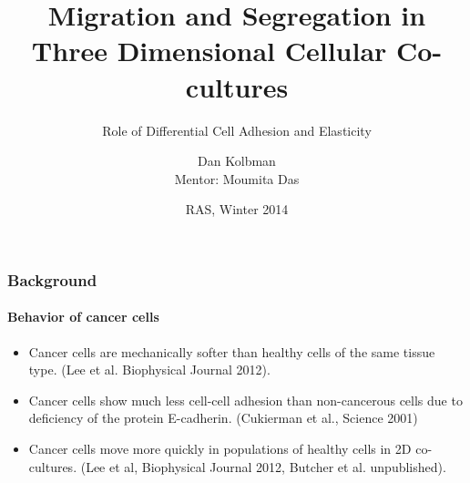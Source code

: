 \documentclass{beamer}
\begin{document}
  \title[Crisis] %
  {Migration and Segregation in Three Dimensional Cellular Co-cultures}
  \subtitle{Role of Differential Cell Adhesion and Elasticity}
  \author[Author, Kolbman] %
  {Dan Kolbman\\Mentor: Moumita Das}
  \date[2014]
  {RAS, Winter 2014}
  \subject{info}


  \frame{\titlepage}
  
  \begin{frame}
    \frametitle{Background}
    \framesubtitle{Behavior of cancer cells}
    
    \begin{itemize}
    \item Cancer cells are mechanically softer than healthy cells of the same tissue type. 
    (Lee et al. Biophysical Journal 2012).
    \item Cancer cells show much less cell-cell adhesion than non-cancerous cells  due to deficiency of the protein E-cadherin. 
    (Cukierman et al., Science 2001)
    \item Cancer cells move more quickly in populations of healthy cells in 2D co-cultures. 
    (Lee et al, Biophysical Journal 2012, Butcher et al. unpublished).
    \end{itemize}
    \vfill
    
  \end{frame}  
  
\end{document}
